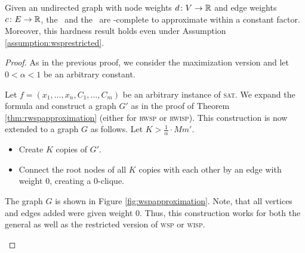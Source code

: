 \begin{theorem}
	\label{thm:wspapproximation}
	Given an undirected graph with node weights $d \colon V \to \mathbb{R}$ and edge weights $c \colon E \to \mathbb{R}$, the \WSP\ and the \WISP\ are \NP-complete to approximate within a constant factor. Moreover, this hardness result holds even under Assumption \ref{assumption:wsprestricted}.
\end{theorem}
\begin{proof}
	As in the previous proof, we consider the maximization version and let $0 < \alpha < 1$ be an arbitrary constant.\medskip
	
	Let $f = (x_1, \ldots, x_n, C_1, \ldots, C_m)$ be an arbitrary instance of \textsc{sat}. We expand the formula and construct a graph $G'$ as in the proof of Theorem \ref{thm:rwspapproximation} (either for \textsc{rwsp} or \textsc{rwisp}). This construction is now extended to a graph $G$ as follows. Let $K > \frac{1}{\alpha} \cdot Mm'$.
	\begin{itemize}
		\item Create $K$ copies of $G'$.
		\item Connect the root nodes of all $K$ copies with each other by an edge with weight $0$, creating a $0$-clique.
	\end{itemize}
	The graph $G$ is shown in Figure \ref{fig:wspapproximation}. Note, that all vertices and edges added were given weight $0$. Thus, this construction works for both the general as well as the restricted version of \textsc{wsp} or \textsc{wisp}.\medskip
	\begin{figure}[h]
		\centering
\end{figure}
\end{proof}
